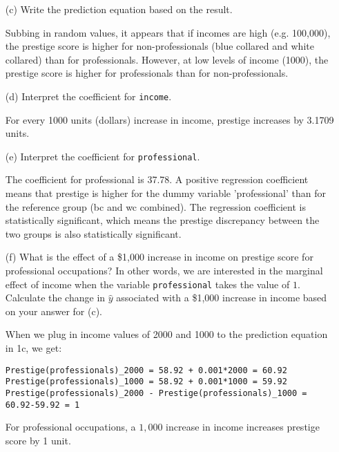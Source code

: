 \documentclass[12pt,letterpaper]{article}
\begin{document}
\begin{enumerate}
	\item [(c)]
	Write the prediction equation based on the result.
\vspace{.5cm}
  
\vspace{.5cm}   
\noindent Subbing in random values, it appears that if incomes are high (e.g. 100,000), the prestige score is higher for non-professionals (blue collared and white collared) than for professionals. However, at low levels of income (1000), the prestige score is higher for professionals than for non-professionals.
	
\newpage
	\item [(d)]
	Interpret the coefficient for \texttt{income}.

\noindent For every 1000 units (dollars) increase in income, prestige increases by 3.1709 units.
	
	\vspace{0.5cm}	
	\item [(e)]
	Interpret the coefficient for \texttt{professional}.

\noindent The coefficient for professional is 37.78. A positive regression coefficient means that prestige is higher for the dummy variable 'professional' than for the reference group (bc and wc combined). The regression coefficient is statistically significant, which means the prestige discrepancy between the two groups is also statistically significant.
	
	\newpage
	\item [(f)]
	What is the effect of a \$1,000 increase in income on prestige score for professional occupations? In other words, we are interested in the marginal effect of income when the variable \texttt{professional} takes the value of $1$. Calculate the change in $\hat{y}$ associated with a \$1,000 increase in income based on your answer for (c).
	
	\vspace{0.6cm}
\noindent When we plug in income values of 2000 and 1000 to the prediction equation in 1c, we get:
\begin{verbatim}
Prestige(professionals)_2000 = 58.92 + 0.001*2000 = 60.92
Prestige(professionals)_1000 = 58.92 + 0.001*1000 = 59.92
Prestige(professionals)_2000 - Prestige(professionals)_1000 = 60.92-59.92 = 1
\end{verbatim}
\noindent For professional occupations, a $1,000$ increase in income increases prestige score by 1 unit.
	

\end{enumerate}
\end{document}
